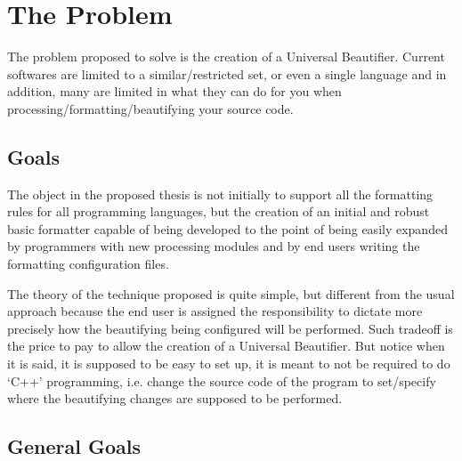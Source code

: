 \section{The Problem}

The problem proposed to solve is the creation of a Universal Beautifier.
Current softwares are limited to a similar/restricted set, or even a single
language and in addition, many are limited in what they can do for you when
processing/formatting/beautifying your source code.
\cite{universalCodeFormatter}


\subsection{Goals}

The object in the proposed thesis is not initially to support all the
formatting rules for all programming languages, but the creation of an
initial and robust basic formatter capable of being developed to the point
of being easily expanded by programmers with new processing modules and by
end users writing the formatting configuration files.

The theory of the technique proposed is quite simple, but different from the
usual approach because the end user is assigned the responsibility to
dictate more precisely how the beautifying being configured will be
performed. Such tradeoff is the price to pay to allow the creation of a
Universal Beautifier. But notice when it is said, it is supposed to be easy
to set up, it is meant to not be required to do `C++' programming, i.e.
change the source code of the program to set/specify where the beautifying
changes are supposed to be performed.


\subsection{General Goals}

